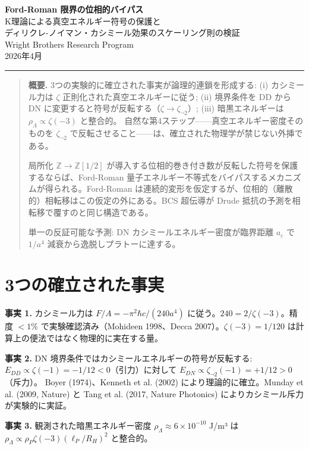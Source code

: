 \documentclass[11pt,a4paper]{article}
\begin{document}
\begin{center}
{\LARGE\bfseries Ford-Roman 限界の位相的バイパス}\\[0.3cm]
{\large K理論による真空エネルギー符号の保護と\\
ディリクレ-ノイマン・カシミール効果のスケーリング則の検証}\\[0.5cm]
{\large Wright Brothers Research Program}\\[0.2cm]
{2026年4月}\\[0.3cm]
\rule{12cm}{0.4pt}
\end{center}

\begin{quotation}
\noindent\textbf{概要.}\quad
3つの実験的に確立された事実が論理的連鎖を形成する:
(i) カシミール力は $\zeta$ 正則化された真空エネルギーに従う;
(ii) 境界条件を DD から DN に変更すると符号が反転する（$\zeta \to \zeta_{\neg 2}$）;
(iii) 暗黒エネルギーは $\rho_\Lambda \propto \zeta(-3)$ と整合的。
自然な第4ステップ——真空エネルギー密度そのものを $\zeta_{\neg 2}$ で反転させること——は、確立された物理学が禁じない外挿である。

局所化 $\mathbb{Z} \to \mathbb{Z}[1/2]$ が導入する位相的巻き付き数が反転した符号を保護するならば、Ford-Roman 量子エネルギー不等式をバイパスするメカニズムが得られる。Ford-Roman は連続的変形を仮定するが、位相的（離散的）相転移はこの仮定の外にある。BCS 超伝導が Drude 抵抗の予測を相転移で覆すのと同じ構造である。

単一の反証可能な予測: DN カシミールエネルギー密度が臨界距離 $a_c$ で $1/a^4$ 減衰から逸脱しプラトーに達する。
\end{quotation}

\section{3つの確立された事実}

\textbf{事実 1.}
カシミール力は $F/A = -\pi^2\hbar c/(240a^4)$ に従う。$240 = 2/\zeta(-3)$。精度 $< 1\%$ で実験確認済み（Mohideen 1998、Decca 2007）。$\zeta(-3) = 1/120$ は計算上の便法ではなく物理的に実在する量。

\textbf{事実 2.}
DN 境界条件ではカシミールエネルギーの符号が反転する:
$E_{DD} \propto \zeta(-1) = -1/12 < 0$（引力）に対して $E_{DN} \propto \zeta_{\neg 2}(-1) = +1/12 > 0$（斥力）。
Boyer (1974)、Kenneth et al. (2002) により理論的に確立。Munday et al. (2009, Nature) と Tang et al. (2017, Nature Photonics) によりカシミール斥力が実験的に実証。

\textbf{事実 3.}
観測された暗黒エネルギー密度 $\rho_\Lambda \approx 6 \times 10^{-10}$ J/m³ は $\rho_\Lambda \propto \rho_P \zeta(-3) (\ell_P/R_H)^2$ と整合的。
\end{document}
